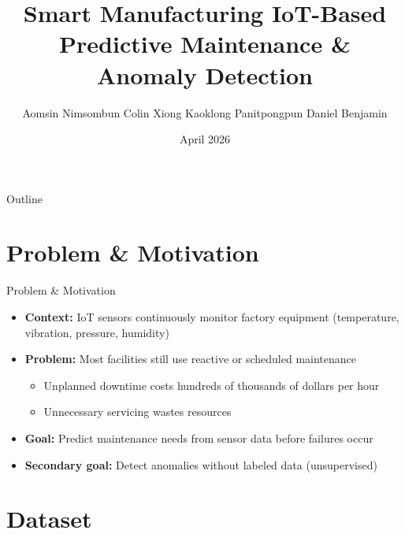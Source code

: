 \documentclass[aspectratio=169]{beamer}
\title{Smart Manufacturing IoT-Based\\Predictive Maintenance \& Anomaly Detection}
\author{Aomsin Nimsombun \quad Colin Xiong \quad Kaoklong Panitpongpun \quad Daniel Benjamin}
\institute{Group 22 --- MANU 465, University of British Columbia}
\date{April 2026}
\begin{document}
\begin{frame}
\titlepage
\end{frame}

\begin{frame}{Outline}
\tableofcontents
\end{frame}

\section{Problem \& Motivation}

\begin{frame}{Problem \& Motivation}
\begin{itemize}
    \item \textbf{Context:} IoT sensors continuously monitor factory equipment (temperature, vibration, pressure, humidity)
    \item \textbf{Problem:} Most facilities still use reactive or scheduled maintenance
    \begin{itemize}
        \item Unplanned downtime costs hundreds of thousands of dollars per hour
        \item Unnecessary servicing wastes resources
    \end{itemize}
    \item \textbf{Goal:} Predict maintenance needs from sensor data before failures occur
    \item \textbf{Secondary goal:} Detect anomalies without labeled data (unsupervised)
\end{itemize}
\end{frame}

\section{Dataset}
\end{document}
